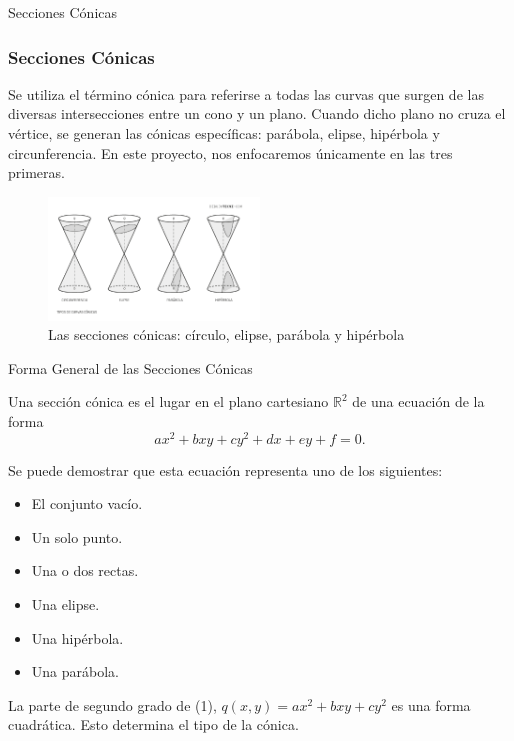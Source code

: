 \documentclass[xcolor={dvipsnames},aspectratio=169,10pt]{beamer}
\begin{document}
\begin{frame}{Secciones Cónicas}
  \frametitle{Secciones Cónicas}
  Se utiliza el término cónica para referirse a todas las curvas que surgen de las diversas intersecciones entre un cono y un plano. 
  Cuando dicho plano no cruza el vértice, se generan las cónicas específicas: parábola, elipse, hipérbola y circunferencia. 
  En este proyecto, nos enfocaremos únicamente en las tres primeras. 
  \begin{figure}
    \includegraphics[width=0.5\textwidth, height=0.6\textheight, keepaspectratio]{images/conics.png}
    \caption{Las secciones cónicas: círculo, elipse, parábola y hipérbola}
  \end{figure}
\end{frame}

\begin{frame}{Forma General de las Secciones Cónicas}
  \begin{definition}
    Una sección cónica es el lugar en el plano cartesiano $\mathbb{R}^2$ de una ecuación de la forma
    \begin{equation*}
      ax^2 + bxy + cy^2 + dx + ey + f = 0. \tag{1}
    \end{equation*}
  \end{definition}
  Se puede demostrar que esta ecuación representa uno de los siguientes:
  \begin{itemize}
    \item El conjunto vacío.
    \item Un solo punto.
    \item Una o dos rectas.
    \item Una elipse.
    \item Una hipérbola.
    \item Una parábola.
\end{itemize}
  La parte de segundo grado de (1), $q(x, y) = ax^2 + bxy + cy^2$ es una forma cuadrática. Esto determina el tipo de la cónica.
\end{frame}
\end{document}

